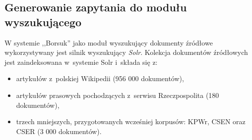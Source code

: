 \documentclass[a4paper, twoside, openright, 12pt]{report}
\begin{document}
        \subsection{Generowanie zapytania do modułu wyszukującego}
            W systemie ,,Borsuk'' jako moduł wyszukujący dokumenty źródłowe wykorzystywany jest silnik wyszukujący \emph{Solr}\cite{SOLR}.
            Kolekcja dokumentów źródłowych jest zaindeksowana w~systemie Solr i~składa się z\cite{BORSUK}:
            \begin{itemize}
                \item artykułów z~polskiej Wikipedii (956 000 dokumentów),
                \item artykułów prasowych pochodzących z~serwisu Rzeczpospolita (180 dokumentów),
                \item trzech mniejszych, przygotowanych wcześniej korpusów: KPWr, CSEN oraz CSER (3 000 dokumentów).
            \end{itemize}
\end{document}
